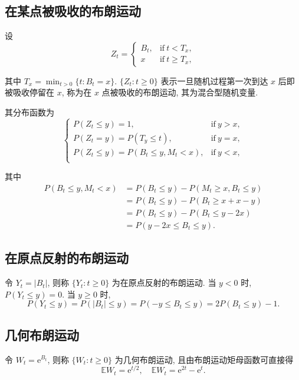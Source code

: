 \documentclass[openany]{ctexbook}
\theoremstyle{kaiti}
\theoremstyle{normal}
\begin{document}
\subsection{在某点被吸收的布朗运动}

设 
\begin{equation}
  Z_t=\begin{cases}B_t,&\text{if}~t<T_x,\\ x&\text{if}~t\geqslant T_x,\end{cases}
\end{equation}

其中 $T_x=\min_{t>0}\{t:B_t=x\}$. $\{Z_t:t\geqslant0\}$ 表示一旦随机过程第一次到达 $x$ 后即被吸收停留在 $x$, 称为在 $x$ 点被吸收的布朗运动, 其为混合型随机变量.

其分布函数为
\begin{equation}
  \begin{cases}
    P(Z_t\leqslant y)=1,&\text{if}~y>x,\\
    P(Z_t=y)=P(T_y\leqslant t),&\text{if}~y=x,\\
    P(Z_t\leqslant y)=P(B_t\leqslant y,M_t<x),&\text{if}~y<x,\\
  \end{cases}
\end{equation}

其中 
\begin{equation}
  \begin{aligned}
    P(B_t\leqslant y,M_t<x)
    &=P(B_t\leqslant y)-P(M_t\geqslant x,B_t\leqslant y)\\
    &=P(B_t\leqslant y)-P(B_t\geqslant x+x-y)\\
    &=P(B_t\leqslant y)-P(B_t\leqslant y-2x)\\
    &=P(y-2x\leqslant B_t\leqslant y).
  \end{aligned}
\end{equation}

\subsection{在原点反射的布朗运动}
令 $Y_t=|B_t|$, 则称 $\{Y_t:t\geqslant0\}$ 为在原点反射的布朗运动. 当 $y<0$ 时, $P(Y_t\leqslant y)=0$. 当 $y\geqslant0$ 时, 
\begin{equation}
  P(Y_t\leqslant y)=P(|B_t|\leqslant y)=P(-y\leqslant B_t\leqslant y)=2P(B_t\leqslant y)-1.
\end{equation}

\subsection{几何布朗运动}
令 $W_t=\mathrm{e}^{B_t}$, 则称 $\{W_t:t\geqslant0\}$ 为几何布朗运动, 且由布朗运动矩母函数可直接得
\begin{equation}
  \mathbb{E}W_t=\mathrm{e}^{t/2},\quad \mathbb{E}W_t=\mathrm{e}^{2t}-\mathrm{e}^{t}.
\end{equation}
\end{document}
